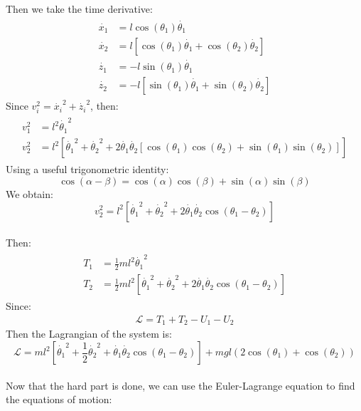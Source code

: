 \documentclass{article}
\begin{document}
Then we take the time derivative:
\begin{align*}
\begin{split}
    \dot{x_1} & = l\cos(\theta_1)\dot{\theta_1} \\
    \dot{x_2} & = l[\cos(\theta_1)\dot{\theta_1} + \cos(\theta_2)\dot{\theta_2}] \\
    \dot{z_1} & = -l\sin(\theta_1)\dot{\theta_1} \\
    \dot{z_2} & = -l[\sin(\theta_1)\dot{\theta_1} + \sin(\theta_2)\dot{\theta_2}]
\end{split}
\end{align*}
Since $v_i^2 = \dot{x_i}^2 + \dot{z_i}^2$, then:
\begin{align*}
\begin{split}
    v_1^2 & = l^2\dot{\theta_1}^2 \\
    v_2^2 & = l^2[\dot{\theta_1}^2 + \dot{\theta_2}^2 + 2\dot{\theta_1}\dot{\theta_2}[\cos(\theta_1)\cos(\theta_2) + \sin(\theta_1)\sin(\theta_2)]]
\end{split}
\end{align*}
Using a useful trigonometric identity:
\begin{equation*}
    \cos(\alpha - \beta) = \cos(\alpha)\cos(\beta) + \sin(\alpha)\sin(\beta)
\end{equation*}
We obtain:
\begin{equation*}
        v_2^2 = l^2[\dot{\theta_1}^2 + \dot{\theta_2}^2 + 2\dot{\theta_1}\dot{\theta_2}\cos(\theta_1 - \theta_2)]
\end{equation*}
\\Then:
\begin{align*}
\begin{split}
    T_1 & = \frac{1}{2}ml^2\dot{\theta_1}^2 \\
    T_2 & = \frac{1}{2}ml^2[\dot{\theta_1}^2 + \dot{\theta_2}^2 + 2\dot{\theta_1}\dot{\theta_2}\cos(\theta_1 - \theta_2)]
\end{split}
\end{align*}
Since:
\begin{align*}
    \mathcal{L} = T_1 + T_2 - U_1 - U_2
\end{align*}
Then the Lagrangian of the system is:
\begin{equation}
    \mathcal{L} = ml^2[\dot{\theta_1}^2 + \frac{1}{2}\dot{\theta_2}^2 + \dot{\theta_1}\dot{\theta_2}\cos(\theta_1-\theta_2)] + mgl(2\cos(\theta_1) + \cos(\theta_2))
\end{equation}
\\Now that the hard part is done, we can use the Euler-Lagrange equation to find the equations of motion:
\end{document}

